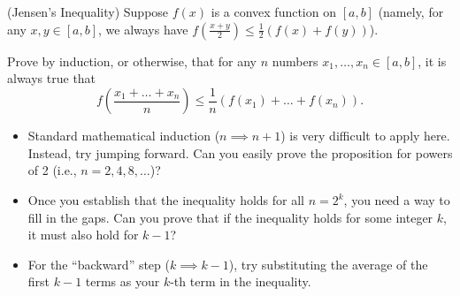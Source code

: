 \begin{problem}
(Jensen's Inequality) Suppose $f(x)$ is a convex function on $[a, b]$ (namely, for any $x, y \in [a, b]$, we always have $f\left(\frac{x+y}{2}\right) \leqslant \frac{1}{2}(f(x) + f(y))$).

Prove by induction, or otherwise, that for any $n$ numbers $x_1, \dots, x_n \in [a, b]$, it is always true that
\[
f\left(\frac{x_1 + \dots + x_n}{n}\right) \leqslant \frac{1}{n}(f(x_1) + \dots + f(x_n)).
\]
\end{problem}

\begin{hint}
\begin{itemize}[leftmargin=*]
    \item Standard mathematical induction ($n \implies n+1$) is very difficult to apply here. Instead, try jumping forward. Can you easily prove the proposition for powers of 2 (i.e., $n = 2, 4, 8, \dots$)?
    \item Once you establish that the inequality holds for all $n=2^k$, you need a way to fill in the gaps. Can you prove that if the inequality holds for some integer $k$, it must also hold for $k-1$?
    \item For the ``backward'' step ($k \implies k-1$), try substituting the average of the first $k-1$ terms as your $k$-th term in the inequality.
\end{itemize}
\end{hint}

